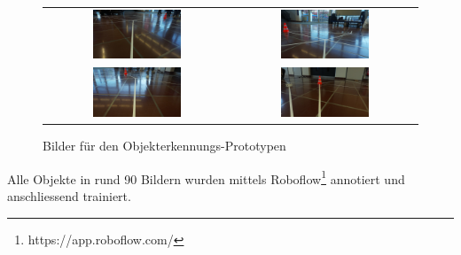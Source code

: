 \documentclass[../main.tex]{subfiles}
\begin{document}
\begin{center}
\begin{figure}[H]
\begin{tabular}{cc}
    \includegraphics[width=0.5\textwidth]{img/prototyping/objekterkennung/Bild1.jpg} &
    \includegraphics[width=0.5\textwidth]{img/prototyping/objekterkennung/Bild2.jpg} \\
    \includegraphics[width=0.5\textwidth]{img/prototyping/objekterkennung/Bild3.jpg} &
    \includegraphics[width=0.5\textwidth]{img/prototyping/objekterkennung/Bild4.jpg}
\end{tabular}
\caption{Bilder für den Objekterkennungs-Prototypen}
\label{img:objectdetection_prototype_images}
\end{figure}
\end{center}

Alle Objekte in rund 90 Bildern wurden mittels Roboflow\footnote{https://app.roboflow.com/} annotiert und anschliessend trainiert. 
\end{document}
